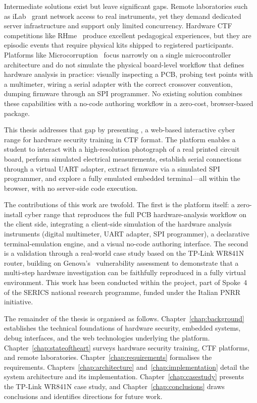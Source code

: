 Intermediate solutions exist but leave significant gaps. Remote laboratories such as iLab~\cite{ilab2004} grant network access to real instruments, yet they demand dedicated server infrastructure and support only limited concurrency. Hardware CTF competitions like RHme~\cite{rhme} produce excellent pedagogical experiences, but they are episodic events that require physical kits shipped to registered participants. Platforms like Microcorruption~\cite{microcorruption} focus narrowly on a single microcontroller architecture and do not simulate the physical board-level workflow that defines hardware analysis in practice: visually inspecting a PCB, probing test points with a multimeter, wiring a serial adapter with the correct crossover convention, dumping firmware through an SPI programmer. No existing solution combines these capabilities with a no-code authoring workflow in a zero-cost, browser-based package.

This thesis addresses that gap by presenting \pcbctf{}, a web-based interactive cyber range for hardware security training in CTF format. The platform enables a student to interact with a high-resolution photograph of a real printed circuit board, perform simulated electrical measurements, establish serial connections through a virtual UART adapter, extract firmware via a simulated SPI programmer, and explore a fully emulated embedded terminal---all within the browser, with no server-side code execution.

The contributions of this work are twofold. The first is the \pcbctf{} platform itself: a zero-install cyber range that reproduces the full PCB hardware-analysis workflow on the client side, integrating a client-side simulation of the hardware analysis instruments (digital multimeter, UART adapter, SPI programmer), a declarative terminal-emulation engine, and a visual no-code authoring interface. The second is a validation through a real-world case study based on the TP-Link WR841N router, building on Genova's~\cite{genova2025} vulnerability assessment to demonstrate that a multi-step hardware investigation can be faithfully reproduced in a fully virtual environment. This work has been conducted within the \artic{} project, part of Spoke~4 of the SERICS national research programme, funded under the Italian PNRR initiative.

The remainder of the thesis is organised as follows. Chapter~\ref{chap:background} establishes the technical foundations of hardware security, embedded systems, debug interfaces, and the web technologies underlying the platform. Chapter~\ref{chap:stateoftheart} surveys hardware security training, CTF platforms, and remote laboratories. Chapter~\ref{chap:requirements} formalises the requirements. Chapters~\ref{chap:architecture} and~\ref{chap:implementation} detail the system architecture and its implementation. Chapter~\ref{chap:casestudy} presents the TP-Link WR841N case study, and Chapter~\ref{chap:conclusions} draws conclusions and identifies directions for future work.
